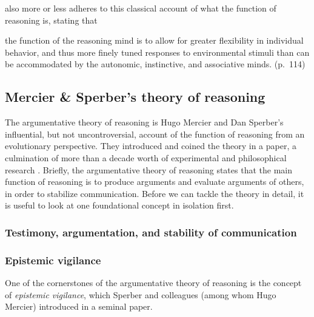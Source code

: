\citet{Goel22} also more or less adheres to this classical account of what the function of reasoning is, stating that
\begin{quoting}
    the function of the reasoning mind is to allow for greater flexibility in individual behavior, and thus more finely tuned responses to environmental stimuli than can be accommodated by the autonomic, instinctive, and associative minds.
    \hfill (p.~114)
\end{quoting}

\subsection{Mercier \& Sperber's theory of reasoning}


The argumentative theory of reasoning is Hugo Mercier and Dan Sperber's influential, but not uncontroversial, account of the function of reasoning from an evolutionary perspective. They introduced and coined the theory in a \citeyear{MS11} paper, a culmination of more than a decade worth of experimental and philosophical research .
Briefly, the argumentative theory of reasoning states that the main function of reasoning is to produce arguments and evaluate arguments of others, in order to stabilize communication.
Before we can tackle the theory in detail, it is useful to look at one foundational concept in isolation first.

\subsubsection{Testimony, argumentation, and stability of communication}


\subsubsection{Epistemic vigilance}

One of the cornerstones of the argumentative theory of reasoning is the concept of \emph{epistemic vigilance}, which Sperber and colleagues (among whom Hugo Mercier) introduced in a seminal \citeyear{Sperber10} paper.

